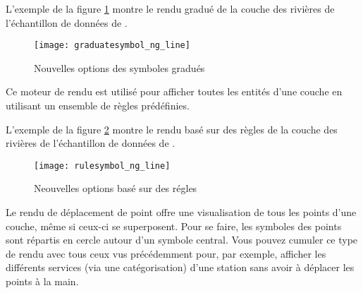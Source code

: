 L'exemple de la figure \ref{fig:gradsymNG} montre le rendu gradué de la couche des rivières de l'échantillon de données de \qg.

\begin{figure}[ht]
   \centering
   \texttt{[image: graduatesymbol\_ng\_line]}
   \caption{Nouvelles options des symboles gradués \nixcaption}\label{fig:gradsymNG}
\end{figure}


Ce moteur de rendu est utilisé pour afficher toutes les entités d'une couche en utilisant un ensemble de règles prédéfinies.

L'exemple de la figure \ref{fig:rulesymNG} montre le rendu basé sur des règles de la couche des rivières de l'échantillon de données de \qg.

\begin{figure}[ht]
   \centering
   \texttt{[image: rulesymbol\_ng\_line]}
   \caption{Neouvelles options basé sur des régles \nixcaption}\label{fig:rulesymNG}
\end{figure}


Le rendu de déplacement de point offre une visualisation de tous les points d'une couche, même si ceux-ci se superposent. Pour se faire, les symboles des points sont répartis en cercle autour d'un symbole central. Vous pouvez cumuler ce type de rendu avec tous ceux vus précédemment pour, par exemple, afficher les différents services (via une catégorisation) d'une station sans avoir à déplacer les points à la main.

